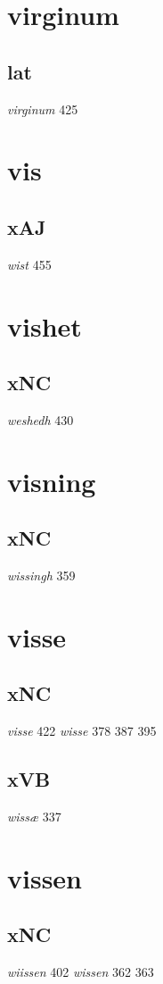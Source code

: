 \documentclass[a4paper,twocolumn]{article}
\begin{document}
\section{virginum}
\label{sec:orgc8ef820}
\subsection{lat}
\label{sec:orgf18a81c}
\emph{virginum} 425 
\section{vis}
\label{sec:orgc0d2706}
\subsection{xAJ}
\label{sec:org31f6511}
\emph{wist} 455 
\section{vishet}
\label{sec:orgf63c09e}
\subsection{xNC}
\label{sec:org72f8fe0}
\emph{weshedh} 430 
\section{visning}
\label{sec:org6980fe1}
\subsection{xNC}
\label{sec:org52fcaec}
\emph{wissingh} 359 
\section{visse}
\label{sec:orgc252cc9}
\subsection{xNC}
\label{sec:org6ba2a39}
\emph{visse} 422 \emph{wisse} 378 387 395 
\subsection{xVB}
\label{sec:org4a5adaa}
\emph{wissæ} 337 
\section{vissen}
\label{sec:org769f7a3}
\subsection{xNC}
\label{sec:org58b9226}
\emph{wiissen} 402 \emph{wissen} 362 363 
\end{document}
